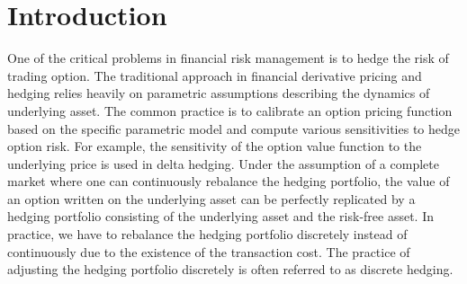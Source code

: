 \documentclass[letterpaper,12pt,titlepage,oneside,final]{book}
\numberwithin{equation}{section}
\theoremstyle{definition}
\begin{document}


\chapter{Introduction}
One of the critical problems in financial risk management is to hedge the risk of trading option. The traditional approach in financial derivative pricing and hedging relies heavily on parametric assumptions describing the dynamics of underlying asset.  The common practice is to calibrate an option pricing function based on the specific parametric model and compute various sensitivities to hedge option risk. For example, the sensitivity of the option value function to the underlying price is used in delta hedging. Under the assumption of a complete market \cite{shreve2004stochastic} where one can continuously rebalance the hedging portfolio, the value of an option written on the underlying asset can be perfectly replicated by a hedging portfolio consisting of the underlying asset and the  risk-free asset.  In practice, we have to rebalance the hedging portfolio discretely instead of continuously due to the existence of the transaction cost.  The practice of adjusting the hedging portfolio discretely is often referred to as discrete hedging.
\end{document}

